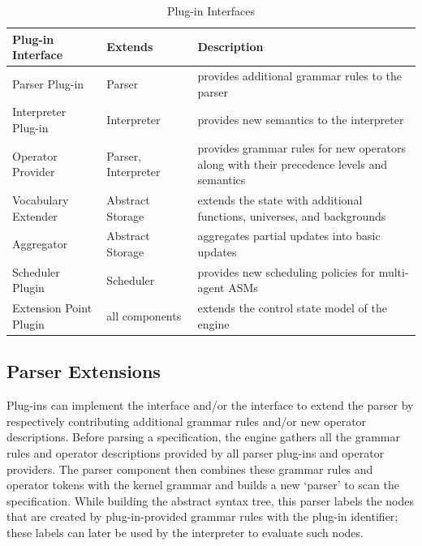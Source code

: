 \documentclass{article}
\begin{document}
\begin{table}
\center
\small
\begin{tabular}{@{\em}llp{5cm}}
\bf Plug-in Interface	& \bf Extends	& \bf Description \\
\hline
Parser Plug-in			& Parser					& provides additional grammar rules to the parser\\
\hline
Interpreter Plug-in		& Interpreter				& provides new semantics to the interpreter\\
\hline
Operator Provider		& Parser, Interpreter~~		& provides grammar rules for new operators along with their precedence levels and semantics\\
\hline
Vocabulary Extender		& Abstract Storage			& extends the state with additional functions, universes, and backgrounds\\
\hline
Aggregator				& Abstract Storage			& aggregates partial updates into basic updates\\
\hline
Scheduler Plugin		& Scheduler					& provides new scheduling policies for multi-agent ASMs\\
\hline
Extension Point Plugin~~ 	& all components			& extends the control state model of the engine\\ 
\end{tabular}
\medskip
\normalsize
\caption{\CoreASM Plug-in Interfaces}
\label{tab:interfaces}
\end{table}

\subsection{Parser Extensions}
\label{sec:parserextensions}

Plug-ins can implement the  interface and/or the 
 interface to extend the parser
by respectively contributing additional grammar rules and/or new operator descriptions. 
Before parsing a specification, the engine gathers all the grammar
rules and operator descriptions provided by all parser plug-ins and
operator providers. The parser component then combines these grammar
rules and operator tokens with the kernel grammar and builds a new
`parser' to scan the specification.  
 While building the abstract syntax
tree, this parser labels the nodes that are created by plug-in-provided
grammar rules with the plug-in identifier; these labels can later be used by
the interpreter to evaluate such nodes.
\end{document}
